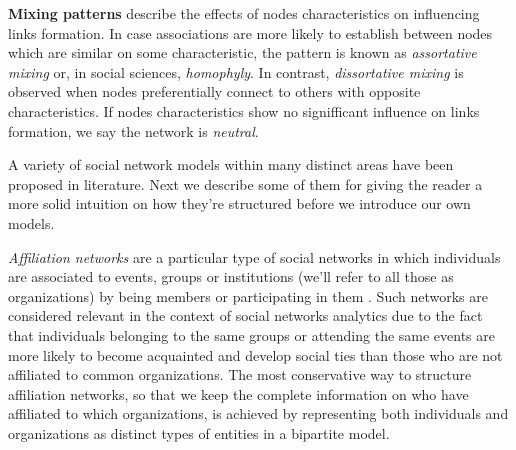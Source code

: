 
\textbf{Mixing patterns} describe the effects of nodes characteristics on influencing links formation.
In case associations are more likely to establish between nodes which are similar on some characteristic, the pattern is known as \textit{assortative mixing} or, in social sciences, \textit{homophyly}.
In contrast, \textit{dissortative mixing} is observed when nodes preferentially connect to others with opposite characteristics. 
If nodes characteristics show no signifficant influence on links formation, we say the network is \textit{neutral}.


A variety of social network models within many distinct areas have been proposed in literature. 
Next we describe some of them for giving the reader a more solid intuition on how they're structured before we introduce our own models.


\textit{Affiliation networks} are a particular type of social networks in which individuals are associated to events, groups or institutions (we'll refer to all those as organizations) by being members or participating in them \cite{Borgatti2015}. 
%
Such networks are considered relevant in the context of social networks analytics due to the fact that individuals belonging to the same groups or attending the same events are more likely to become acquainted and develop social ties than those who are not affiliated to common organizations.
%
The most conservative way to structure affiliation networks, so that we keep the complete information on who have affiliated to which organizations, is achieved by representing both individuals and organizations as distinct types of entities in a bipartite model.
 
